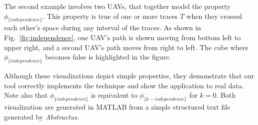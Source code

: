 The second example involves two UAVs, that together model the property $\phi_{\{independence\}}$.
This property is true of one or more traces $T$ when they crossed each other's space during any interval of the traces.
As shown in Fig.~\ref{fig:independence}, one UAV's path is shown moving from bottom left to upper right, and a second UAV's path moves from right to left.
The cube where $\phi_{\{independence\}}$ becomes false is highlighted in the figure.


Although these visualizations depict simple properties, they demonstrate that our tool correctly implements the technique and show the application to real data.
Note also that $\phi_{\{independence\}}$ is equivalent to $\phi_{\{k-independence\}}$ for $k=0$.
Both visualization are generated in MATLAB from a simple structured text file generated by \emph{Abstractus}.

